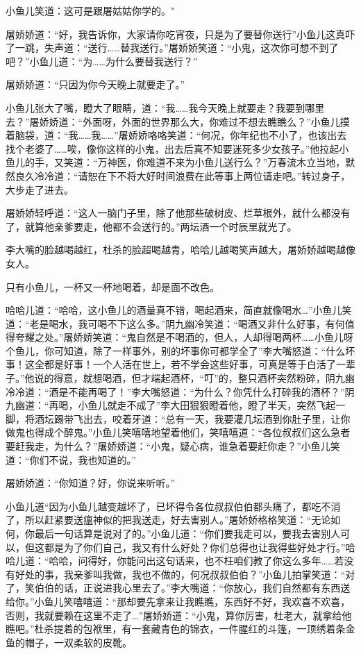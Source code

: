 \documentclass[12pt,oneside]{book}
\begin{document}
小鱼儿笑道：这可是跟屠姑姑你学的。"

屠娇娇道：``好，我告诉你，大家请你吃宵夜，只是为了要替你送行''小鱼儿这真吓了一跳，失声道：``送行\ldots\ldots 替我送行。''屠娇娇笑道：``小鬼，这次你可想不到了吧？''小鱼儿道：``为\ldots\ldots 为什么要替我送行？''

屠娇娇道：``只因为你今天晚上就要走了。''

小鱼儿张大了嘴，瞪大了眼睛，道：``我\ldots\ldots 我今天晚上就要走？我要到哪里去？''屠娇娇道：``外面呀，外面的世界那么大，你难过不想去瞧瞧么？''小鱼儿摸着脑袋，道：``我\ldots\ldots 我\ldots\ldots{}''屠娇娇咯咯笑道：``何况，你年纪也不小了，也该出去找个老婆了\ldots\ldots 唉，像你这样的小鬼，出去后真不知要迷死多少女孩子。''他拉起小鱼儿的手，又笑道：``万神医，你难道不来为小鱼儿送行么？''万春流木立当地，默然良久冷冷道：``请恕在下不将大好时间浪费在此等事上两位请走吧。''转过身子，大步走了进去。

屠娇娇轻呼道：``这人一脑门子里，除了他那些破树皮、烂草根外，就什么都没有了，就算他亲爹要走，他都不会送行的。''两坛酒一个时辰里就光了。

李大嘴的脸越喝越红，杜杀的脸超喝越青，哈哈儿越喝笑声越大，屠娇娇越喝越像女人。

只有小鱼儿，一杯又一杯地喝着，却是面不改色。

哈哈儿道：``哈哈，这小鱼儿的酒量真不错，喝起酒来，简直就像喝水\ldots{}''小鱼儿笑道：``老是喝水，我可喝不下这么多。''阴九幽冷笑道：``喝酒又非什么好事，有何值得夸耀之处。''屠娇娇笑道：``鬼自然是不喝酒的，但人，人却得喝两杯\ldots\ldots 小鱼儿呀个鱼儿，你可知道，除了一样事外，别的坏事你可都学全了''李大嘴怒道：``什么坏事！这全都是好事！一个人活在世上，若不学会这些好事，可真是等于白活了一辈子。''他说的得意，就想喝酒，但才端起酒杯，``叮''的，整只酒杯突然粉碎，阴九幽冷冷道：``酒是不能再喝了！''李大嘴怒道：``为什么？你凭什么打碎我的酒杯？''阴九幽道：``再喝，小鱼儿就走不成了''李大田狠狠瞪着他，瞪了半天，突然飞起一脚，将酒坛踢带飞出去，咬着牙道：``总有一天，我要灌几坛酒到你肚子里，让你做鬼也得成个醉鬼。''小鱼儿笑嘻嘻地望着他们，笑嘻嘻道：``各位叔叔们这么急者要赶我走，为什么？''屠娇娇道：``小鬼，疑心病，谁急着要赶你走？''小鱼儿笑道：``你们不说，我也知道的。''

屠娇娇道：``你知道？好，你说来听听。''

小鱼儿道``因为小鱼儿越变越坏了，已坏得令各位叔叔伯伯都头痛了，都吃不消了，所以赶紧要送瘟神似的把我送走，好去害别人。''屠娇娇格格笑道：``无论如何，你最后一句话算是说对了的。''小鱼儿道：``你们要我走可以，要我去害别人可以，但这都是为了你们自己，我又有什么好处？你们总得也让我得些好处才行。''哈哈儿道：``哈哈，问得好，你能问出这句话来，也不枉咱们教了你这么多年\ldots\ldots 若没有好处的事，我亲爹叫我做，我也不做的，何况叔叔伯伯？''小鱼儿拍掌笑道：``对了，笑伯伯的话，正说进我心里去了。''李大嘴道：``你放心，我们自然都有东西送给你。''小鱼儿笑嘻嘻道：``那却要先拿来让我瞧瞧，东西好不好，我欢喜不欢喜，否则，我就要赖在这里不走了\ldots{}''屠娇娇道：``小鬼，算你厉害，杜老大，就拿给他瞧吧。''杜杀提着的包袱里，有一套藏青色的锦衣，一件腥红的斗篷，一顶绣着条金鱼的帽子，一双柔软的皮靴。
\end{document}
